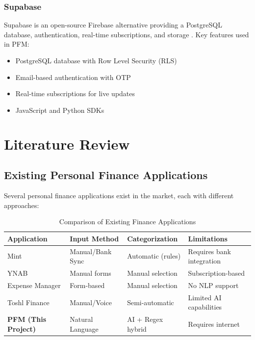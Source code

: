 \subsubsection{Supabase}

Supabase is an open-source Firebase alternative providing a PostgreSQL database, authentication, real-time subscriptions, and storage \cite{supabase2024}. Key features used in PFM:

\begin{itemize}
    \item PostgreSQL database with Row Level Security (RLS)
    \item Email-based authentication with OTP
    \item Real-time subscriptions for live updates
    \item JavaScript and Python SDKs
\end{itemize}

\section{Literature Review}

\subsection{Existing Personal Finance Applications}

Several personal finance applications exist in the market, each with different approaches:

\begin{table}[H]
\centering
\caption{Comparison of Existing Finance Applications}
\label{tab:app-comparison}
\begin{tabular}{|p{3cm}|p{3cm}|p{3cm}|p{4cm}|}
\hline
\textbf{Application} & \textbf{Input Method} & \textbf{Categorization} & \textbf{Limitations} \\
\hline
Mint & Manual/Bank Sync & Automatic (rules) & Requires bank integration \\
\hline
YNAB & Manual forms & Manual selection & Subscription-based \\
\hline
Expense Manager & Form-based & Manual selection & No NLP support \\
\hline
Toshl Finance & Manual/Voice & Semi-automatic & Limited AI capabilities \\
\hline
\textbf{PFM (This Project)} & Natural Language & AI + Regex hybrid & Requires internet \\
\hline
\end{tabular}
\end{table}


